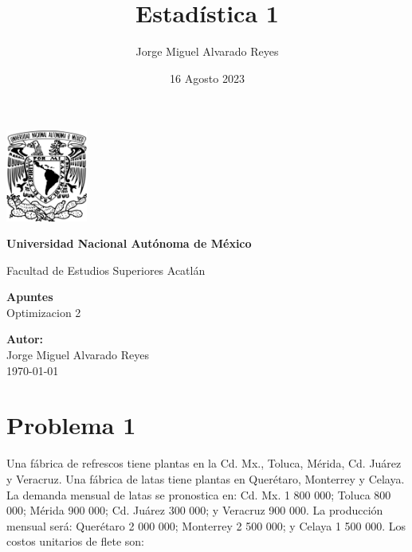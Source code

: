 \documentclass{article}
\title{Estadística 1}
\author{Jorge Miguel Alvarado Reyes}
\date{16 Agosto 2023}
\begin{document}
\begin{titlepage}
    \begin{center}
        \includegraphics[width=0.2\textwidth]{../../unam.png}
        \vspace*{.5cm}

        \LARGE
        \textbf{Universidad Nacional Autónoma de México}

        \vspace{0.5cm}
        \LARGE
        Facultad de Estudios Superiores Acatlán

        \vspace{2cm}

        \textbf{Apuntes} \\
        Optimizacion 2

        \vfill

        \vspace{1cm}

        \textbf{\large Autor:} \\
        Jorge Miguel Alvarado Reyes \\
        \vspace{.5cm}
        \normalsize \today

    \end{center}
\end{titlepage}
\newpage

\tableofcontents

\newpage

\section{Problema 1}

Una fábrica de refrescos tiene plantas en la Cd. Mx., Toluca, Mérida, Cd. Juárez y Veracruz. Una fábrica de latas tiene plantas en Querétaro, Monterrey y Celaya. La demanda mensual de latas se pronostica en: Cd. Mx. 1 800 000; Toluca 800 000; Mérida 900 000; Cd. Juárez 300 000; y Veracruz 900 000. La producción mensual será: Querétaro 2 000 000; Monterrey 2 500 000; y Celaya 1 500 000. Los costos unitarios de flete son:
\end{document}
